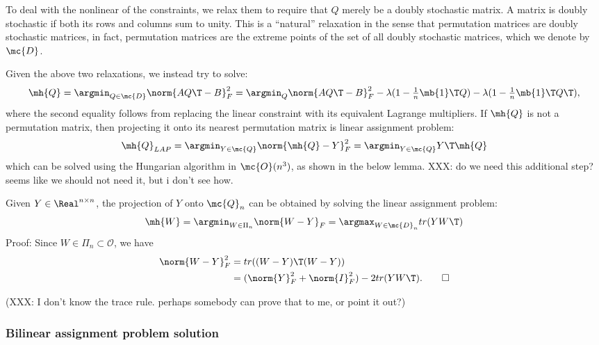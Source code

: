 To deal with the nonlinear of the constraints, we relax them to require that $Q$ merely be a doubly stochastic matrix.  A matrix is doubly stochastic if both its rows and columns sum to unity.  This is a ``natural'' relaxation in the sense that permutation matrices are doubly stochastic matrices, in fact, permutation matrices are the extreme points of the set of all doubly stochastic matrices, which we denote by $\mc{D}$.  

Given the above two relaxations, we instead try to solve:
\begin{align} \label{eq:a}
	\mh{Q} = \argmin_{Q \in \mc{D}} \norm{A Q\T - B}_F^2 = \argmin_{Q} \norm{A Q\T - B}_F^2 - \lambda (1 - \tfrac{1}{n}\mb{1}\T Q) - \lambda (1 - \tfrac{1}{n}\mb{1}\T Q\T),
\end{align}
where the second equality follows from replacing the linear constraint with its equivalent Lagrange multipliers.  If $\mh{Q}$ is not a permutation matrix, then projecting it onto its nearest permutation matrix is linear assignment problem:
\begin{align}
	\mh{Q}_{LAP} = \argmin_{Y \in \mc{Q}} \norm{\mh{Q} - Y}_F^2 = \argmin_{Y \in \mc{Q}} Y\T \mh{Q}
\end{align}
which can be solved using the Hungarian algorithm in $\mc{O}(n^3)$, as shown in the below lemma. XXX: do we need this additional step? seems like we should not need it, but i don't see how.

\begin{Lem}
  Given $Y \in \Real^{n \times n}$, the projection of $Y$ onto $\mc{Q}_n$ can
  be obtained by solving the linear assignment problem:
  $$ 
  \mh{W}= \argmin_{W \in \Pi_n} \norm{ W-Y}_F = \argmax_{W \in \mc{D}_n}  tr(YW\T)
  $$
  Proof: Since $W \in \Pi_n \subset \mathcal O$, we have
  \begin{align}
  \norm{W-Y}_F^2 &= tr( (W-Y)\T (W-Y)) \\
  &= (\norm{Y}_F^2 + \norm{I}_F^2) - 2tr( Y W\T ). \qed
  \end{align}
\end{Lem}

(XXX: I don't know the trace rule.  perhaps somebody can prove that to me, or point it out?)




\subsubsection{Bilinear assignment problem solution} %
\label{ssub:bilinear_assignment_problem_solution}


